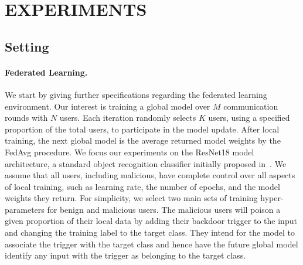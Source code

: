 \documentclass{article} %
\begin{document}
\vspace{-10pt}
\section{EXPERIMENTS}
\vspace{-10pt}

\subsection{Setting}

\vspace{-10pt}
\paragraph{Federated Learning.} We start by giving further specifications regarding the federated learning environment. Our interest is training a global model over $M$ communication rounds with $N$ users. Each iteration randomly selects $K$ users, using a specified proportion of the total users, to participate in the model update. After local training, the next global model is the average returned model weights by the FedAvg procedure. We focus  our experiments on the ResNet18 model architecture, a standard object recognition classifier initially proposed in~\cite{resnet}. We assume that all users, including malicious, have complete control over all aspects of local training, such as learning rate, the number of epochs, and the model weights they return. For simplicity, we select two main sets of training hyper-parameters for benign and malicious users. The malicious users will poison a given proportion of their local data by adding their backdoor trigger to the input and changing the training label to the target class. They intend for the model to associate the trigger with the target class and hence have the future global model identify any input with the trigger as belonging to the target class. 

\vspace{-10pt}
\end{document}

